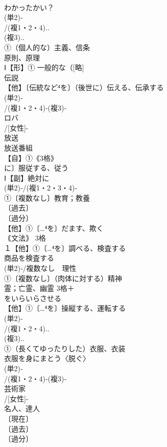 \documentclass[8pt]{extreport}
\begin{document}
\begin{CJK}{UTF8}{min}
\\	わかったかい？
\\	(単2)‐
\\	/(複1・2・4)..
\\	(複3)..
\\	①（個人的な）主義、信条
\\	原則、原理
\\	Ⅰ【形】① 一般的な（[略]
\\	伝説 
\\	【他】〔伝統など⁴を〕（後世に）伝える、伝承する
\\	(単2)‐
\\	/(複1・2・4)‐(複3)‐
\\	ロバ
\\	/[女性]-
\\	放送　
\\	放送番組
\\	【自】①《3格》
\\	に〕服従する、従う
\\	Ⅰ【副】絶対に
\\	(単2)‐/(複1・2・3・4)‐
\\	①〔複数なし〕教育；教養
\\	〔過去〕
\\	〔過分〕
\\	【他】①〔…⁴を〕だます、欺く
\\	｟文法｠ 3格
\\	１【他】①〔…⁴を〕調べる、検査する
\\	商品を検査する 
\\	(単2)‐/複数なし　理性 
\\	①〔複数なし〕（肉体に対する）精神
\\	霊；亡霊、幽霊 3格＋
\\	をいらいらさせる
\\	【他】①〔…⁴を〕操縦する、運転する
\\	(単2)‐
\\	/(複1・2・4)..
\\	(複3)..
\\	①（長くてゆったりした）衣服、衣装 
\\	衣服を身にまとう〈脱ぐ〉 
\\	(単2)‐
\\	/(複1・2・4)‐(複3)‐
\\	芸術家 
\\	/[女性]-
\\	名人、達人
\\	〔現在〕
\\	〔過去〕
\\	〔過分〕

\end{CJK}
\end{document}
